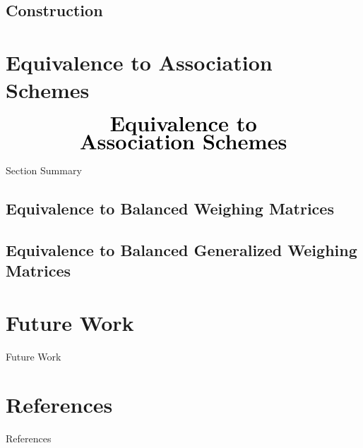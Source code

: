 \documentclass{beamer}
\begin{document}
\subsection[]{Construction}


\section{Equivalence to Association Schemes}

\begin{frame}
  \[
    \begin{array}{c}
      \text{\huge\bf Equivalence to}
      \\
      \text{\huge\bf Association Schemes}
    \end{array}
  \]
\end{frame}

\begin{frame}{Section Summary}
  \tableofcontents[sections={5}]
\end{frame}

\subsection[]{Equivalence to Balanced Weighing Matrices}
\subsection[]{Equivalence to Balanced Generalized Weighing Matrices}


\section{Future Work}

\begin{frame}{Future Work}
\end{frame}


\section{References}

\begin{frame}{References}
  
  
\end{frame}
\end{document}
